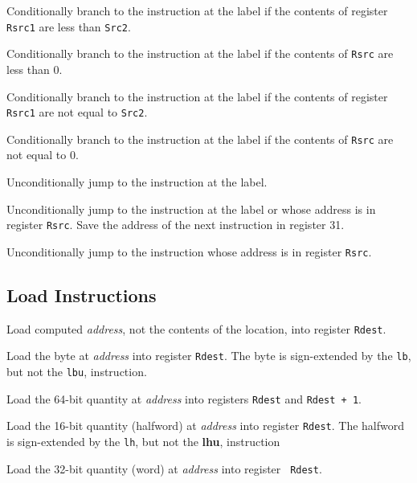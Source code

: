 Conditionally branch to the instruction at the label if the contents
of register {\tt Rsrc1} are less than {\tt Src2}.

Conditionally branch to the instruction at the label if the contents
of {\tt Rsrc} are less than 0.

Conditionally branch to the instruction at the label if the contents
of register {\tt Rsrc1} are not equal to {\tt Src2}.

Conditionally branch to the instruction at the label if the contents
of {\tt Rsrc} are not equal to 0.

Unconditionally jump to the instruction at the label.

Unconditionally jump to the instruction at the label or whose address
is in register {\tt Rsrc}.  Save the address of the next
instruction in register 31.

Unconditionally jump to the instruction whose address is in register
{\tt Rsrc}.


\subsection {Load Instructions}

Load computed {\em address\/}, not the contents of the location, into
register {\tt Rdest}.

Load the byte at {\em address\/} into register {\tt Rdest}.  The byte
is sign-extended by the {\tt lb}, but not the {\tt lbu}, instruction.

Load the 64-bit quantity at {\em address\/} into registers {\tt Rdest}
and {\tt Rdest + 1}.

Load the 16-bit quantity (halfword) at {\em address\/} into register
{\tt Rdest}.  The halfword is sign-extended by the {\tt lh}, but not
the {\bf lhu}, instruction

Load the 32-bit quantity (word) at {\em address\/} into register {\tt
Rdest}.


